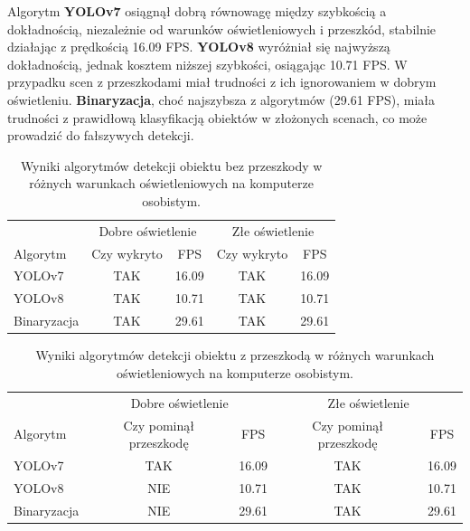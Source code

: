 \documentclass[a4paper,twoside,12pt]{book}
\begin{document}
Algorytm \textbf{YOLOv7} osiągnął dobrą równowagę między szybkością a dokładnością, niezależnie od warunków oświetleniowych i przeszkód, stabilnie działając z prędkością 16.09 FPS. \textbf{YOLOv8} wyróżniał się najwyższą dokładnością, jednak kosztem niższej szybkości, osiągając 10.71 FPS. W przypadku scen z przeszkodami miał trudności z ich ignorowaniem w dobrym oświetleniu. \textbf{Binaryzacja}, choć najszybsza z algorytmów (29.61 FPS), miała trudności z prawidłową klasyfikacją obiektów w złożonych scenach, co może prowadzić do fałszywych detekcji.

\begin{table}[h!]
    \centering
    \caption{Wyniki algorytmów detekcji obiektu bez przeszkody w różnych warunkach oświetleniowych na komputerze osobistym.}
    \label{tab:bez_przeszkody}
    \begin{tabular}{lcccc}
    \toprule
     & \multicolumn{2}{c}{Dobre oświetlenie} & \multicolumn{2}{c}{Złe oświetlenie} \\
    \cmidrule(r){2-3} \cmidrule(r){4-5}
    Algorytm & Czy wykryto & FPS & Czy wykryto & FPS \\
    \midrule
    YOLOv7 & TAK & 16.09 & TAK & 16.09 \\
    YOLOv8 & TAK & 10.71 & TAK & 10.71 \\
    Binaryzacja & TAK & 29.61 & TAK & 29.61 \\
    \bottomrule
    \end{tabular}
\end{table}

\begin{table}[h!]
    \centering
    \caption{Wyniki algorytmów detekcji obiektu z przeszkodą w różnych warunkach oświetleniowych na komputerze osobistym.}
    \label{tab:z_przeszkoda}
    \begin{tabular}{lcccc}
    \toprule
     & \multicolumn{2}{c}{Dobre oświetlenie} & \multicolumn{2}{c}{Złe oświetlenie} \\
    \cmidrule(r){2-3} \cmidrule(r){4-5}
    Algorytm & Czy pominął przeszkodę & FPS & Czy pominął przeszkodę & FPS \\
    \midrule
    YOLOv7 & TAK & 16.09 & TAK & 16.09 \\
    YOLOv8 & NIE & 10.71 & TAK & 10.71 \\
    Binaryzacja & NIE & 29.61 & TAK & 29.61 \\
    \bottomrule
    \end{tabular}
\end{table}
\end{document}
